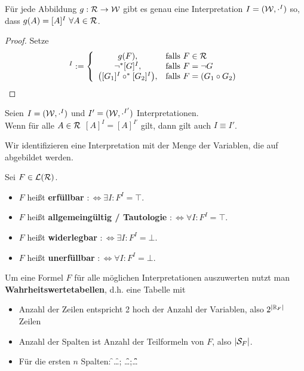 \begin{proposition}\label{proposition3.10}
	Für jede Abbildung $g:\RR\to\W$ gibt es genau eine Interpretation $I=(\W,\cdot^I)$ so, dass $g(A)=[A]^I~\forall A\in\RR$.
\end{proposition}

\begin{proof}
	Setze
	\begin{align*}
		[F]^I:=\left\lbrace\begin{array}{cl}
			g(F),&\falls F\in\RR\\			
			\neg^\ast[G]^I, &\falls F=\neg G\\
			\big([G_1]^I\circ^\ast[G_2]^I\big),&\falls F=(G_1\circ G_2)
		\end{array}\right.
	\end{align*}
\end{proof}

\begin{proposition}\label{proposition3.11}
	Seien $I=(\W,\cdot^I)$ und $I'=(\W,\cdot^{I'})$ Interpretationen.\\
	Wenn für alle $A\in\RR$ $[A]^I=[A]^{I'}$ gilt, dann gilt auch $I\equiv I'$.
\end{proposition}

Wir identifizieren eine Interpretation mit der Menge der Variablen, die auf \w abgebildet werden.

\begin{definition}\label{def3.12}
	Sei $F\in\L(\RR)$.
	\begin{itemize}
		\item $F$ heißt \textbf{erfüllbar} $:\Longleftrightarrow\exists I:F^I=\top$.
		\item $F$ heißt \textbf{allgemeingültig / Tautologie} $:\Longleftrightarrow\forall I:F^I=\top$.
		\item $F$ heißt \textbf{widerlegbar} $:\Longleftrightarrow\exists I:F^I=\bot$.
		\item $F$ heißt \textbf{unerfüllbar} $:\Longleftrightarrow\forall I:F^I=\bot$.
	\end{itemize}
\end{definition}

Um eine Formel $F$ für alle möglichen Interpretationen auszuwerten nutzt man \textbf{Wahrheitswertetabellen}, d.h. eine Tabelle mit 
\begin{itemize}
	\item Anzahl der Zeilen entspricht 2 hoch der Anzahl der Variablen, also $2^{|\R_F|}$ Zeilen
	\item Anzahl der Spalten ist Anzahl der Teilformeln von $F$, also $|\S_F|$.
	\item Für die ersten $n$ Spalten: \w\f\w\f\ldots; \w\w\f\f\ldots;\w\w\w\w\f\f\f\f\ldots
\end{itemize}

